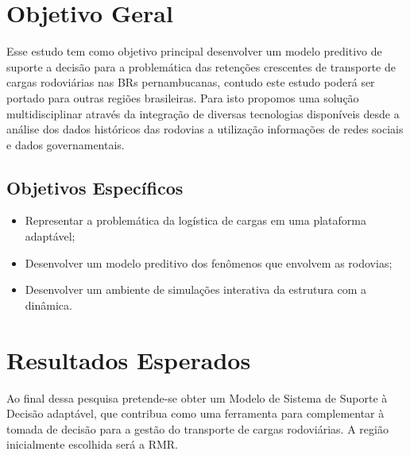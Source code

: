 \section{ Objetivo Geral}\label{intro:objetivo}

Esse estudo tem como objetivo principal desenvolver um modelo preditivo de suporte a decisão para a problemática das retenções crescentes de transporte de cargas rodoviárias 
nas BRs pernambucanas, contudo este estudo poderá ser portado para outras regiões brasileiras. 
Para isto propomos uma solução multidisciplinar através da integração de diversas tecnologias disponíveis desde a análise dos dados históricos das 
rodovias a utilização informações de redes sociais e dados governamentais.

\subsection{ Objetivos Específicos}\label{intro:especificos}

\begin{itemize}
 \item Representar a problemática da logística de cargas em uma plataforma adaptável;

 \item Desenvolver um modelo preditivo dos fenômenos que envolvem as rodovias;

 \item Desenvolver um ambiente de simulações interativa da estrutura com a dinâmica.

\end{itemize}


\section{ Resultados Esperados}\label{resultado}

Ao final dessa pesquisa pretende-se obter um Modelo de Sistema de Suporte à Decisão adaptável, que contribua como uma ferramenta para  
complementar à tomada de decisão para a gestão do transporte de cargas rodoviárias. A região inicialmente escolhida será a RMR.








